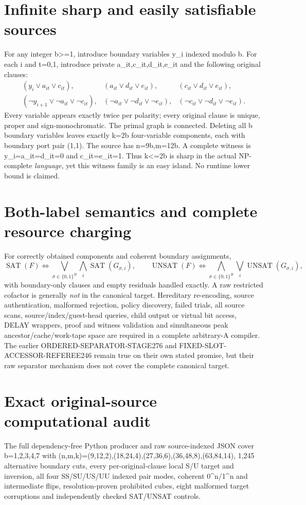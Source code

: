 \documentclass[11pt]{article}
\begin{document}
\section{Infinite sharp and easily satisfiable sources}
For any integer b>=1, introduce boundary variables y_i indexed modulo b. For each i and t=0,1, introduce private a_{it},c_{it},d_{it},e_{it} and the following original clauses:
\[
\begin{array}{lll}
(y_i\lor a_{it}\lor c_{it}),&
(a_{it}\lor d_{it}\lor e_{it}),&
(c_{it}\lor d_{it}\lor e_{it}),\\
(\neg y_{i+1}\lor\neg a_{it}\lor\neg c_{it}),&
(\neg a_{it}\lor\neg d_{it}\lor\neg e_{it}),&
(\neg c_{it}\lor\neg d_{it}\lor\neg e_{it}).
\end{array}
\]
Every variable appears exactly twice per polarity; every original clause is unique, proper and sign-monochromatic. The primal graph is connected. Deleting all b boundary variables leaves exactly k=2b four-variable components, each with boundary port pair (1,1). The source has n=9b,m=12b. A complete witness is y_i=a_{it}=d_{it}=0 and c_{it}=e_{it}=1. Thus k<=2b is sharp in the actual NP-complete \emph{language}, yet this witness family is an easy island. No runtime lower bound is claimed.

\section{Both-label semantics and complete resource charging}
For correctly obtained components and coherent boundary assignments,
\[
\operatorname{SAT}(F)\Longleftrightarrow
\bigvee_{\sigma\in\{0,1\}^{B}}\bigwedge_i\operatorname{SAT}(G_{\sigma,i}),
\qquad
\operatorname{UNSAT}(F)\Longleftrightarrow
\bigwedge_{\sigma\in\{0,1\}^{B}}\bigvee_i\operatorname{UNSAT}(G_{\sigma,i}),
\]
with boundary-only clauses and empty residuals handled exactly. A raw restricted cofactor is generally \emph{not} in the canonical target. Hereditary re-encoding, source authentication, malformed rejection, policy discovery, failed trials, all source scans, source/index/guest-head queries, child output or virtual bit access, DELAY wrappers, proof and witness validation and simultaneous peak ancestor/cache/work-tape space are required in a complete arbitrary-A compiler. The earlier ORDERED-SEPARATOR-STAGE276 and FIXED-SLOT-ACCESSOR-REFEREE246 remain true on their own stated promise, but their raw separator mechanism does not cover the complete canonical target.

\section{Exact original-source computational audit}
The full dependency-free Python producer and raw source-indexed JSON cover b=1,2,3,4,7 with (n,m,k)=(9,12,2),(18,24,4),(27,36,6),(36,48,8),(63,84,14), 1,245 alternative boundary cuts, every per-original-clause local S/U target and inversion, all four SS/SU/US/UU indexed pair modes, coherent 0^n/1^n and intermediate flips, resolution-proven prohibited cubes, eight malformed target corruptions and independently checked SAT/UNSAT controls.
\end{document}
